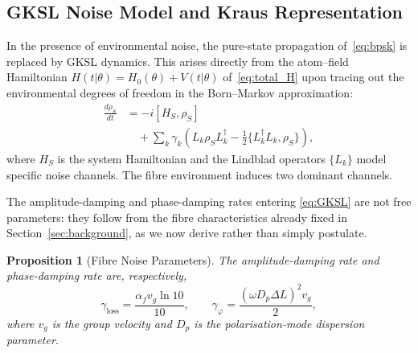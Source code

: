 \documentclass[journal,twocolumn]{IEEEtran}
\theoremstyle{definition}
\theoremstyle{plain}
\newtheorem{proposition}[theorem]{Proposition}
\newcommand{\alphaf}{\alpha_{f}}
\begin{document}
\subsection{GKSL Noise Model and Kraus Representation}

In the presence of environmental noise, the pure-state propagation
of~\eqref{eq:bpsk} is replaced by GKSL dynamics.  This arises
directly from the atom--field Hamiltonian $H(t|\theta) = H_0(\theta)
+ V(t|\theta)$ of~\eqref{eq:total_H} upon tracing out the
environmental degrees of freedom in the Born--Markov approximation:
\begin{align}
  \frac{d\rho_S}{dt} &= -i[H_S, \rho_S] \nonumber\\
  &\quad + \sum_k \gamma_k \!\left(L_k \rho_S L_k^\dagger
    - \tfrac{1}{2}\{L_k^\dagger L_k, \rho_S\}\right),
  \label{eq:GKSL}
\end{align}
where $H_S$ is the system Hamiltonian and the Lindblad operators
$\{L_k\}$ model specific noise channels.  The fibre environment
induces two dominant channels.

The amplitude-damping and phase-damping rates entering
\eqref{eq:GKSL} are not free parameters: they follow from the fibre
characteristics already fixed in Section~\ref{sec:background}, as we
now derive rather than simply postulate.

\begin{proposition}[Fibre Noise Parameters]
\label{prop:noise_rates}
The amplitude-damping rate and phase-damping rate are, respectively,
\begin{equation}
  \gamma_{\mathrm{loss}} = \frac{\alphaf v_g \ln 10}{10}, \qquad
  \gamma_\varphi = \frac{(\omega D_p \Delta L)^2 v_g}{2},
  \label{eq:noise_rates}
\end{equation}
where $v_g$ is the group velocity and $D_p$ is the
polarisation-mode dispersion parameter.
\end{proposition}
\end{document}

